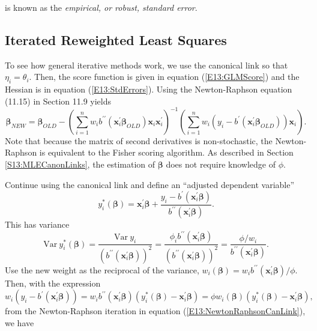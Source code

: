 is known as the \emph{empirical, or robust, standard
error}.

\subsection{Iterated Reweighted Least Squares}\label{S13:IterRWLS}

To see how general iterative methods work, we use the canonical link
so that $\eta_i = \theta_i$. Then, the score function is given in
equation (\ref{E13:GLMScore}) and the Hessian is in equation
(\ref{E13:StdErrors}). Using the Newton-Raphson equation (11.15) in
Section 11.9 yields
\begin{equation}\label{E13:NewtonRaphsonCanLink}
\boldsymbol \beta_{NEW} = \boldsymbol \beta_{OLD} -  \left(
\sum_{i=1}^n w_i b^{\prime \prime}(\mathbf{x}_i^{\prime} \boldsymbol
\beta _{OLD}) \mathbf{x}_i \mathbf{x}_i^{\prime} \right)^{-1} \left(
\sum_{i=1}^n w_i (y_i - b^{\prime}(\mathbf{x}_i^{\prime} \boldsymbol
\beta_{OLD})) \mathbf{x}_i \right) .
  \end{equation}
Note that because the matrix of second derivatives is
non-stochastic, the Newton-Raphson is equivalent to the Fisher
scoring algorithm. As described in Section \ref{S13:MLECanonLinks},
the estimation of $\boldsymbol \beta$ does not require knowledge of
$\phi$.


Continue using the canonical link and define an ``adjusted dependent
variable''
\begin{equation*}
y_i^{\ast}(\boldsymbol \beta) = \mathbf{x}_i^{\prime} \boldsymbol
\beta + \frac{y_i - b^{\prime}(\mathbf{x}_i^{\prime} \boldsymbol
\beta)}{b^{\prime \prime}(\mathbf{x}_i^{\prime} \boldsymbol \beta)}.
\end{equation*}
This has variance
\begin{equation*}
\mathrm{Var~}y_i^{\ast}(\boldsymbol \beta) =
\frac{\mathrm{Var~}y_i}{(b^{\prime \prime}(\mathbf{x}_i^{\prime}
\boldsymbol \beta))^2} = \frac{\phi_i b^{\prime
\prime}(\mathbf{x}_i^{\prime} \boldsymbol \beta)}{(b^{\prime
\prime}(\mathbf{x}_i^{\prime} \boldsymbol \beta))^2} = \frac{\phi/
w_i }{b^{\prime \prime}(\mathbf{x}_i^{\prime} \boldsymbol \beta)}.
\end{equation*}
Use the new weight as the reciprocal of the variance,
$w_i(\boldsymbol \beta)=w_i b^{\prime \prime}(\mathbf{x}_i^{\prime}
\boldsymbol \beta) / \phi.$ Then, with the expression
\begin{equation*}
w_i \left(y_i - b^{\prime}(\mathbf{x}_i^{\prime} \boldsymbol
\beta)\right) = w_i b^{\prime \prime}(\mathbf{x}_i^{\prime}
\boldsymbol \beta) (y_i^{\ast}(\boldsymbol \beta) -
\mathbf{x}_i^{\prime} \boldsymbol \beta) = \phi w_i(\boldsymbol
\beta) (y_i^{\ast}(\boldsymbol \beta) - \mathbf{x}_i^{\prime}
\boldsymbol \beta),
\end{equation*}
from the Newton-Raphson iteration in equation
(\ref{E13:NewtonRaphsonCanLink}), we have

